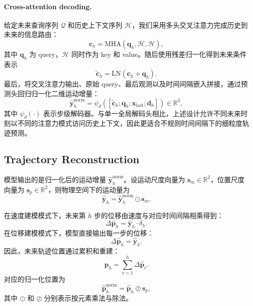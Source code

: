 \paragraph{Cross-attention decoding.}
给定未来查询序列 $\mathcal{Q}$ 和历史上下文序列 $\mathcal{H}$，我们采用多头交叉注意力完成历史到未来的信息路由：
\begin{equation}
\bm{c}_h = \mathrm{MHA}\!\left(\bm{q}_h, \mathcal{H}, \mathcal{H}\right),
\end{equation}
其中 $\bm{q}_h$ 为 query，$\mathcal{H}$ 同时作为 key 和 value。随后使用残差归一化得到未来条件表示
\begin{equation}
\tilde{\bm{c}}_h = \mathrm{LN}(\bm{c}_h + \bm{q}_h).
\end{equation}
最后，将交叉注意力输出、原始 query、最后观测以及时间间隔嵌入拼接，通过预测头回归归一化二维运动增量：
\begin{equation}
\hat{\bm{y}}_h^{\mathrm{norm}} = \psi_d([\tilde{\bm{c}}_h; \bm{q}_h; \bm{x}_{\mathrm{last}}; \bm{d}_h]) \in \mathbb{R}^{2},
\end{equation}
其中 $\psi_d(\cdot)$ 表示步级解码器。与单一全局解码头相比，上述设计允许不同未来时刻以不同的注意力模式访问历史上下文，因此更适合不规则时间间隔下的细粒度轨迹预测。

\subsection{Trajectory Reconstruction}
\label{subsec:reconstruction}

模型输出的是归一化后的运动增量 $\hat{\bm{y}}_h^{\mathrm{norm}}$。设运动尺度向量为 $\bm{s}_m \in \mathbb{R}^{2}$，位置尺度向量为 $\bm{s}_p \in \mathbb{R}^{2}$，则物理空间下的运动量为
\begin{equation}
\hat{\bm{y}}_h = \hat{\bm{y}}_h^{\mathrm{norm}} \odot \bm{s}_m.
\end{equation}

在速度建模模式下，未来第 $h$ 步的位移由速度与对应时间间隔相乘得到：
\begin{equation}
\Delta \hat{\bm{p}}_h = \hat{\bm{y}}_h \cdot \delta_h.
\end{equation}
在位移建模模式下，模型直接输出每一步的位移：
\begin{equation}
\Delta \hat{\bm{p}}_h = \hat{\bm{y}}_h.
\end{equation}
因此，未来轨迹位置通过累积和重建：
\begin{equation}
\hat{\bm{p}}_h = \sum_{r=1}^{h} \Delta \hat{\bm{p}}_r.
\end{equation}
对应的归一化位置为
\begin{equation}
\hat{\bm{p}}_h^{\mathrm{norm}} = \hat{\bm{p}}_h \oslash \bm{s}_p,
\end{equation}
其中 $\odot$ 和 $\oslash$ 分别表示按元素乘法与除法。

